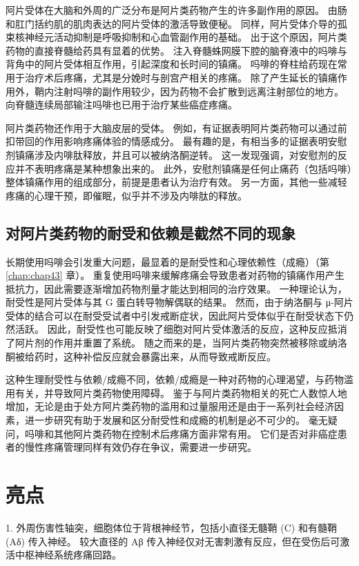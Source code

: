 阿片受体在大脑和外周的广泛分布是阿片类药物产生的许多副作用的原因。 
由肠和肛门括约肌的肌肉表达的阿片受体的激活导致便秘。 
同样，阿片受体介导的孤束核神经元活动抑制是呼吸抑制和心血管副作用的基础。 
出于这个原因，阿片类药物的直接脊髓给药具有显着的优势。 
注入脊髓蛛网膜下腔的脑脊液中的吗啡与背角中的阿片受体相互作用，引起深度和长时间的镇痛。 
吗啡的脊柱给药现在常用于治疗术后疼痛，尤其是分娩时与剖宫产相关的疼痛。 
除了产生延长的镇痛作用外，鞘内注射吗啡的副作用较少，因为药物不会扩散到远离注射部位的地方。 
向脊髓连续局部输注吗啡也已用于治疗某些癌症疼痛。


阿片类药物还作用于大脑皮层的受体。 
例如，有证据表明阿片类药物可以通过前扣带回的作用影响疼痛体验的情感成分。 
最有趣的是，有相当多的证据表明安慰剂镇痛涉及内啡肽释放，并且可以被纳洛酮逆转。 
这一发现强调，对安慰剂的反应并不表明疼痛是某种想象出来的。 
此外，安慰剂镇痛是任何止痛药（包括吗啡）整体镇痛作用的组成部分，前提是患者认为治疗有效。 
另一方面，其他一些减轻疼痛的心理干预，即催眠，似乎并不涉及内啡肽的释放。


\subsection{对阿片类药物的耐受和依赖是截然不同的现象}
长期使用吗啡会引发重大问题，最显着的是耐受性和心理依赖性（成瘾）（第 \ref{chap:chap43} 章）。 
重复使用吗啡来缓解疼痛会导致患者对药物的镇痛作用产生抵抗力，因此需要逐渐增加药物剂量才能达到相同的治疗效果。 
一种理论认为，耐受性是阿片受体与其 G 蛋白转导物解偶联的结果。 
然而，由于纳洛酮与 μ-阿片受体的结合可以在耐受受试者中引发戒断症状，因此阿片受体似乎在耐受状态下仍然活跃。 
因此，耐受性也可能反映了细胞对阿片受体激活的反应，这种反应抵消了阿片剂的作用并重置了系统。 
随之而来的是，当阿片类药物突然被移除或纳洛酮被给药时，这种补偿反应就会暴露出来，从而导致戒断反应。


这种生理耐受性与依赖/成瘾不同，依赖/成瘾是一种对药物的心理渴望，与药物滥用有关，并导致阿片类药物使用障碍。 
鉴于与阿片类药物相关的死亡人数惊人地增加，无论是由于处方阿片类药物的滥用和过量服用还是由于一系列社会经济因素，进一步研究有助于发展和区分耐受性和成瘾的机制是必不可少的。 
毫无疑问，吗啡和其他阿片类药物在控制术后疼痛方面非常有用。 
它们是否对非癌症患者的慢性疼痛管理同样有效仍存在争议，需要进一步研究。


\section{亮点}

1. 外周伤害性轴突，细胞体位于背根神经节，包括小直径无髓鞘 (C) 和有髓鞘 (Aδ) 传入神经。 
较大直径的 Aβ 传入神经仅对无害刺激有反应，但在受伤后可激活中枢神经系统疼痛回路。 


